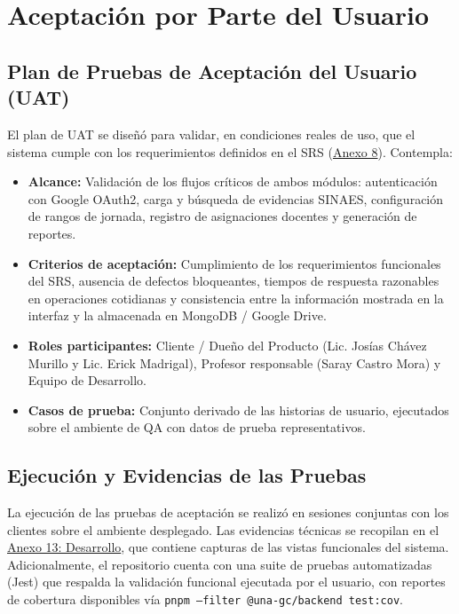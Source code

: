 \section{Aceptación por Parte del Usuario}

\subsection{Plan de Pruebas de Aceptación del Usuario (UAT)}

El plan de UAT se diseñó para validar, en condiciones reales de uso, que el sistema cumple con los requerimientos definidos en el SRS (\hyperref[anexo:documento_srs]{Anexo 8}). Contempla:

\begin{itemize}
    \item \textbf{Alcance:} Validación de los flujos críticos de ambos módulos: autenticación con Google OAuth2, carga y búsqueda de evidencias SINAES, configuración de rangos de jornada, registro de asignaciones docentes y generación de reportes.
    \item \textbf{Criterios de aceptación:} Cumplimiento de los requerimientos funcionales del SRS, ausencia de defectos bloqueantes, tiempos de respuesta razonables en operaciones cotidianas y consistencia entre la información mostrada en la interfaz y la almacenada en MongoDB / Google Drive.
    \item \textbf{Roles participantes:} Cliente / Dueño del Producto (Lic. Josías Chávez Murillo y Lic. Erick Madrigal), Profesor responsable (Saray Castro Mora) y Equipo de Desarrollo.
    \item \textbf{Casos de prueba:} Conjunto derivado de las historias de usuario, ejecutados sobre el ambiente de QA con datos de prueba representativos.
\end{itemize}

\subsection{Ejecución y Evidencias de las Pruebas}

La ejecución de las pruebas de aceptación se realizó en sesiones conjuntas con los clientes sobre el ambiente desplegado. Las evidencias técnicas se recopilan en el \hyperref[anexo:desarrollo]{Anexo 13: Desarrollo}, que contiene capturas de las vistas funcionales del sistema. Adicionalmente, el repositorio cuenta con una suite de pruebas automatizadas (Jest) que respalda la validación funcional ejecutada por el usuario, con reportes de cobertura disponibles vía \texttt{pnpm --filter @una-gc/backend test:cov}.

